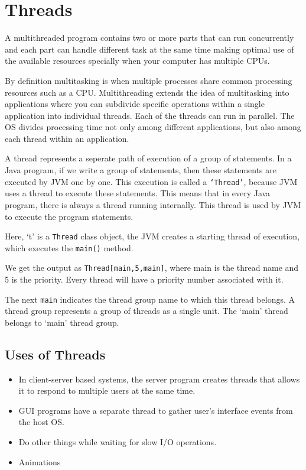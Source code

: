 \documentclass[11pt,a4paper]{article}
\author{TalentSprint}
\date{}
\begin{document}
\section*{Threads}
A multithreaded program contains two or more parts that can run concurrently and each part can handle different task at the same time making optimal use of the available resources specially when your computer has multiple CPUs.

By definition multitasking is when multiple processes share common processing resources such as a CPU. Multithreading extends the idea of multitasking into applications where you can subdivide specific operations within a single application into individual threads. Each of the threads can run in parallel. The OS divides processing time not only among different applications, but also among each thread within an application.

A thread represents a seperate path of execution of a group of statements. In a Java program, if we write a group of statements, then these statements are executed by JVM one by one. This execution is called a \texttt{`Thread'}, because JVM uses a thread to execute these statements. This means that in every Java program, there is always a thread running internally. This thread is used by JVM to execute the program statements.

Here, `t' is a \texttt{Thread} class object, the JVM creates a starting thread of execution, which executes the \texttt{main()} method.

We get the output as \texttt{Thread[main,5,main]}, where main is the thread name and 5 is the priority. Every thread will have a priority number associated with it.

The next \texttt{main} indicates the thread group name to which this thread belongs. A thread group represents a group of threads as a single unit. The `main' thread belongs to `main' thread group.

\subsection*{Uses of Threads}
\begin{itemize}
\item In client-server based systems, the server program creates threads that allows it to respond to multiple users at the same time.
\item GUI programs have a separate thread to gather user's interface events from the host OS.
\item Do other things while waiting for slow I/O operations.
\item Animations
\end{itemize}
\end{document}
